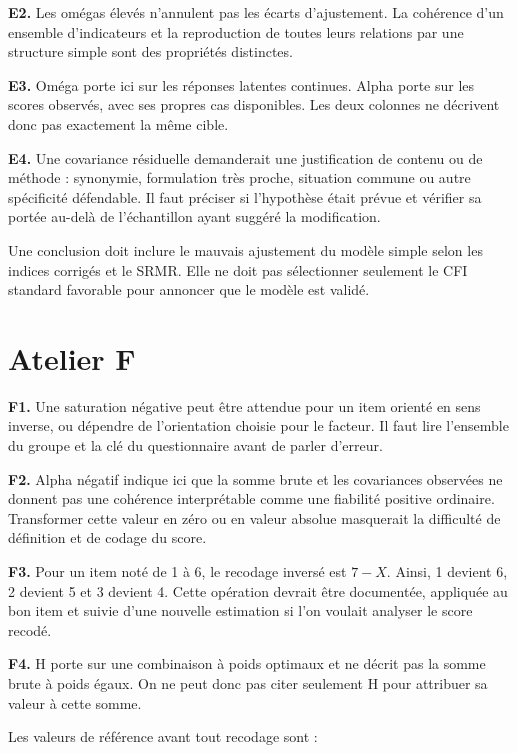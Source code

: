 \documentclass[
  french,
  11pt,
  a4paper,
  DIV=11,
  numbers=noendperiod]{scrreprt}
\begin{document}
\textbf{E2.} Les omégas élevés n'annulent pas les écarts d'ajustement.
La cohérence d'un ensemble d'indicateurs et la reproduction de toutes
leurs relations par une structure simple sont des propriétés distinctes.

\textbf{E3.} Oméga porte ici sur les réponses latentes continues. Alpha
porte sur les scores observés, avec ses propres cas disponibles. Les
deux colonnes ne décrivent donc pas exactement la même cible.

\textbf{E4.} Une covariance résiduelle demanderait une justification de
contenu ou de méthode : synonymie, formulation très proche, situation
commune ou autre spécificité défendable. Il faut préciser si l'hypothèse
était prévue et vérifier sa portée au-delà de l'échantillon ayant
suggéré la modification.

Une conclusion doit inclure le mauvais ajustement du modèle simple selon
les indices corrigés et le SRMR. Elle ne doit pas sélectionner seulement
le CFI standard favorable pour annoncer que le modèle est validé.

\section{Atelier F}\label{atelier-f}

\textbf{F1.} Une saturation négative peut être attendue pour un item
orienté en sens inverse, ou dépendre de l'orientation choisie pour le
facteur. Il faut lire l'ensemble du groupe et la clé du questionnaire
avant de parler d'erreur.

\textbf{F2.} Alpha négatif indique ici que la somme brute et les
covariances observées ne donnent pas une cohérence interprétable comme
une fiabilité positive ordinaire. Transformer cette valeur en zéro ou en
valeur absolue masquerait la difficulté de définition et de codage du
score.

\textbf{F3.} Pour un item noté de 1 à 6, le recodage inversé est
\(7-X\). Ainsi, 1 devient 6, 2 devient 5 et 3 devient 4. Cette opération
devrait être documentée, appliquée au bon item et suivie d'une nouvelle
estimation si l'on voulait analyser le score recodé.

\textbf{F4.} H porte sur une combinaison à poids optimaux et ne décrit
pas la somme brute à poids égaux. On ne peut donc pas citer seulement H
pour attribuer sa valeur à cette somme.

Les valeurs de référence avant tout recodage sont :

\end{document}
